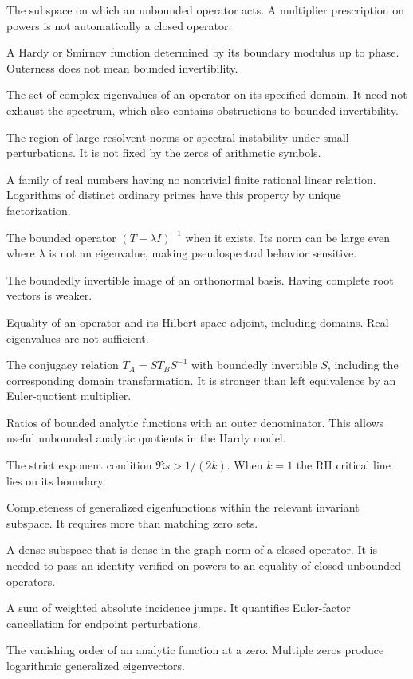 \documentclass[12pt,letterpaper]{article}
\numberwithin{equation}{section}
\theoremstyle{remark}
\begin{document}
\begin{description}[style=nextline,leftmargin=1.5em]
\item[Operator domain] The subspace on which an unbounded operator acts. A multiplier prescription on powers is not automatically a closed operator.
\item[Outer function] A Hardy or Smirnov function determined by its boundary modulus up to phase. Outerness does not mean bounded invertibility.
\item[Point spectrum] The set of complex eigenvalues of an operator on its specified domain. It need not exhaust the spectrum, which also contains obstructions to bounded invertibility.
\item[Pseudospectrum] The region of large resolvent norms or spectral instability under small perturbations. It is not fixed by the zeros of arithmetic symbols.
\item[Rational independence] A family of real numbers having no nontrivial finite rational linear relation. Logarithms of distinct ordinary primes have this property by unique factorization.
\item[Resolvent] The bounded operator \((T-\lambda I)^{-1}\) when it exists. Its norm can be large even where \(\lambda\) is not an eigenvalue, making pseudospectral behavior sensitive.
\item[Riesz basis] The boundedly invertible image of an orthonormal basis. Having complete root vectors is weaker.
\item[Self-adjointness] Equality of an operator and its Hilbert-space adjoint, including domains. Real eigenvalues are not sufficient.
\item[Similarity] The conjugacy relation \(T_A=ST_BS^{-1}\) with boundedly invertible \(S\), including the corresponding domain transformation. It is stronger than left equivalence by an Euler-quotient multiplier.
\item[Smirnov class] Ratios of bounded analytic functions with an outer denominator. This allows useful unbounded analytic quotients in the Hardy model.
\item[Sobolev threshold] The strict exponent condition $\Re s>1/(2k)$. When $k=1$ the RH critical line lies on its boundary.
\item[Spectral synthesis] Completeness of generalized eigenfunctions within the relevant invariant subspace. It requires more than matching zero sets.
\item[Strong graph-core property] A dense subspace that is dense in the graph norm of a closed operator. It is needed to pass an identity verified on powers to an equality of closed unbounded operators.
\item[Weighted graph variation] A sum of weighted absolute incidence jumps. It quantifies Euler-factor cancellation for endpoint perturbations.
\item[Zero multiplicity] The vanishing order of an analytic function at a zero. Multiple zeros produce logarithmic generalized eigenvectors.
\end{description}
\end{document}
